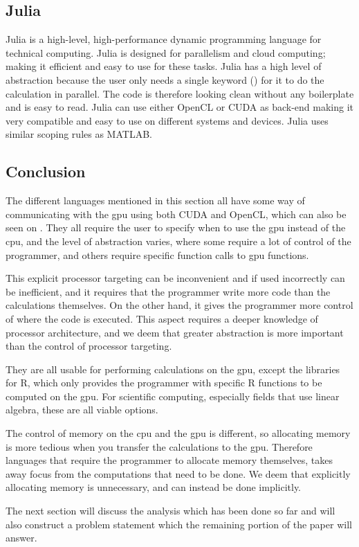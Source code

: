 \subsection{Julia}
Julia is a high-level, high-performance dynamic programming language for technical computing.
Julia is designed for parallelism and cloud computing; making it efficient and easy to use for these tasks.
Julia has a high level of abstraction because the user only needs a single keyword (\@parallel) for it to do the calculation in parallel.
The code is therefore looking clean without any boilerplate and is easy to read.
Julia can use either OpenCL or CUDA as back-end making it very compatible and easy to use on different systems and devices.
Julia uses similar scoping rules as MATLAB. \citep{Julia_Git, Julia_scope,Julia}

 

\subsection{Conclusion}  

The different languages mentioned in this section all have some way of communicating with the \acrshort{gpu} using both CUDA and OpenCL, which can also be seen on .
They all require the user to specify when to use the \acrshort{gpu} instead of the \acrshort{cpu}, and the level of abstraction varies, where some require a lot of control of the programmer, and others require specific function calls to \acrshort{gpu} functions.

This explicit processor targeting can be inconvenient and if used incorrectly can be inefficient, and it requires that the programmer write more code than the calculations themselves.
On the other hand, it gives the programmer more control of where the code is executed.
This aspect requires a deeper knowledge of processor architecture, and we deem that greater abstraction is more important than the control of processor targeting.

They are all usable for performing calculations on the \acrshort{gpu}, except the libraries for R, which only provides the programmer with specific R functions to be computed on the \acrshort{gpu}. 
For scientific computing, especially fields that use linear algebra, these are all viable options.

The control of memory on the \acrshort{cpu} and the \acrshort{gpu} is different, so allocating memory is more tedious when you transfer the calculations to the \acrshort{gpu}.
Therefore languages that require the programmer to allocate memory themselves, takes away focus from the computations that need to be done.
We deem that explicitly allocating memory is unnecessary, and can instead be done implicitly.

The next section will discuss the analysis which has been done so far and will also construct a problem statement which the remaining portion of the paper will answer.